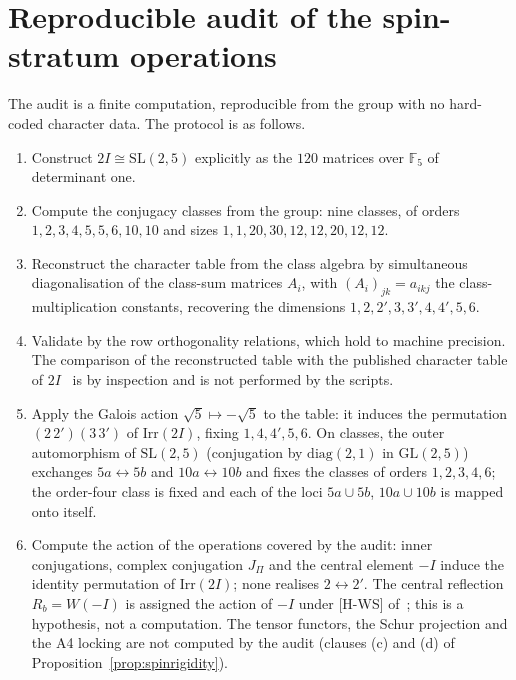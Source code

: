 \documentclass[11pt]{article}
\theoremstyle{definition}
\theoremstyle{remark}
\begin{document}
    \newpage
    \appendix

  \section{Reproducible audit of the spin-stratum operations}
    \label{app:audit}

    The audit is a finite computation, reproducible from the group with no hard-coded character data.
    The protocol is as follows.
    \begin{enumerate}
      \item Construct $2I\cong\mathrm{SL}(2,5)$ explicitly as the $120$ matrices over $\mathbb{F}_5$ of determinant one.
      \item Compute the conjugacy classes from the group: nine classes, of orders $1,2,3,4,5,5,6,10,10$ and sizes
      $1,1,20,30,12,12,20,12,12$.
      \item Reconstruct the character table from the class algebra by simultaneous diagonalisation of the class-sum
      matrices $A_i$, with $(A_i)_{jk}=a_{ikj}$ the class-multiplication constants, recovering the dimensions
      $1,2,2',3,3',4,4',5,6$.
      \item Validate by the row orthogonality relations, which hold to machine precision.
      The comparison of the reconstructed table with the published character table of $2I$~\cite{Beau2026a1} is by
      inspection and is not performed by the scripts.
      \item Apply the Galois action $\sqrt{5}\mapsto-\sqrt{5}$ to the table: it induces the permutation
      $(2\,2')(3\,3')$ of $\mathrm{Irr}(2I)$, fixing $1,4,4',5,6$.
      On classes, the outer automorphism of $\mathrm{SL}(2,5)$ (conjugation by $\mathrm{diag}(2,1)$ in
      $\mathrm{GL}(2,5)$) exchanges $5a\leftrightarrow5b$ and $10a\leftrightarrow10b$ and fixes the classes of orders
      $1,2,3,4,6$; the order-four class is fixed and each of the loci $5a\cup5b$, $10a\cup10b$ is mapped onto itself.
      \item Compute the action of the operations covered by the audit: inner conjugations, complex conjugation
      $J_\Pi$ and the central element $-I$ induce the identity permutation of $\mathrm{Irr}(2I)$; none realises
      $2\leftrightarrow2'$.
      The central reflection $R_b=W(-I)$ is assigned the action of $-I$ under [H-WS] of~\cite{Beau2026q11of}; this is a
      hypothesis, not a computation.
      The tensor functors, the Schur projection and the A4 locking are not computed by the audit (clauses (c) and (d) of
      Proposition~\ref{prop:spinrigidity}).
    \end{enumerate}
\end{document}
